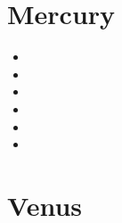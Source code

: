 

\section{Mercury}

\begin{small}
\begin{itemize}
\item[\twothousandseven] 
\item[\twothousandeight] 
\item[\twothousandtwelve] 
\item[\twothousandtwentyone] 
\item[\twothousandtwentytwo] 
\item[2025] 
\end{itemize}
\end{small}

 
\section{Venus}

